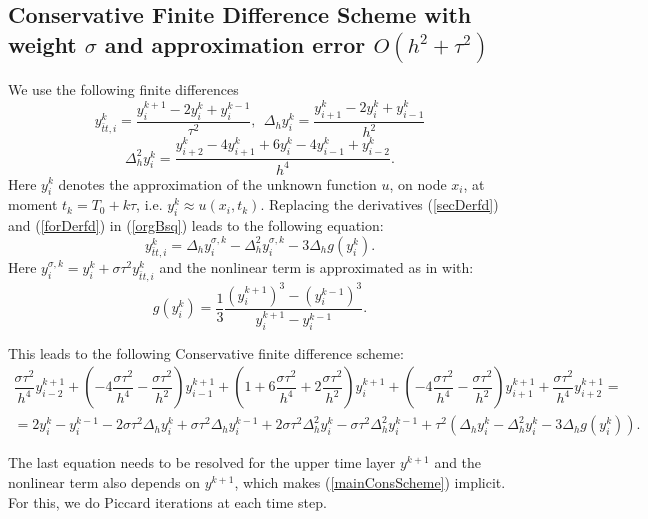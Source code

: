 \documentclass[%
 aip,
cp,  
 amsmath,amssymb,
 reprint,
]{iopconfser}
\newcommand{\rf}[1]{(\ref{#1})}
\begin{document}
\subsection{ Conservative Finite Difference Scheme with weight $\sigma$ and approximation error $O(h^2+\tau^2)$}

We use the following finite differences
\begin{equation}\label{secDerfd}
y_{\bar{t}t,i}^k=\dfrac{y_i^{k+1}-2y_i^k+y_i^{k-1}}{\tau^2},~~\Delta_h y_i^k=\dfrac{y_{i+1}^k-2y_i^k+y_{i-1}^k}{h^2}
\end{equation}
\begin{equation}\label{forDerfd}
\Delta_h^2 y_i^k=\dfrac{y_{i+2}^k-4y_{i+1}^k+6y_{i}^k-4y_{i-1}^k+y_{i-2}^k}{h^4}.
\end{equation}
Here $y_{i}^k$ denotes the approximation of the unknown function $u$, on node $x_i$, at moment $t_k = T_0 + k \tau$, i.e. $y_{i}^k \approx u(x_i,t_k)$. Replacing the derivatives \rf{secDerfd} and \rf{forDerfd} in \rf{orgBsq} leads to the following equation:
\begin{equation}\label{scheme1}
y_{\bar{t}t,i}^k=\Delta_h y_i^{\sigma,k}-\Delta_h^2 y_i^{\sigma,k} - 3\Delta_h g(y_i^k).
\end{equation}
Here $ y_i^{\sigma,k}= y_i^{k}+\sigma \tau^2 y_{\bar{t}t,i}^k$ and the nonlinear term is approximated as in \cite{consCitat} with:
\begin{equation}\label{nonLin}
g(y_i^k) = \frac{1}{3} \frac{(y_i^{k+1})^3 - (y_i^{k-1})^3}{y_i^{k+1} - y_i^{k-1}}.
\end{equation}

This leads to the following Conservative finite difference scheme:
\begin{eqnarray}\label{mainConsScheme}
\dfrac{\sigma\tau^2}{h^4}y_{i-2}^{k+1}+\left(-4\dfrac{\sigma\tau^2}{h^4}-\dfrac{\sigma\tau^2}{h^2}\right)y_{i-1}^{k+1}+\left(1+6\dfrac{\sigma\tau^2}{h^4}+2\dfrac{\sigma\tau^2}{h^2}\right)y_{i}^{k+1}+\left(-4\dfrac{\sigma\tau^2}{h^4}-\dfrac{\sigma\tau^2}{h^2}\right)y_{i+1}^{k+1}+\dfrac{\sigma\tau^2}{h^4}y_{i+2}^{k+1}=\nonumber\\
=2y_i^k-y_i^{k-1}-2\sigma\tau^2\Delta_h y_i^k+\sigma\tau^2\Delta_hy_i^{k-1}+2\sigma\tau^2\Delta_h^2y_i^k-\sigma\tau^2\Delta_h^2y_i^{k-1}+\tau^2\left(\Delta_hy_i^k-\Delta_h^2y_i^k-3\Delta_h g(y_i^k)\right).
\end{eqnarray}

The last equation needs to be resolved for the upper time layer $y^{k+1}$ and the nonlinear term also depends on $y^{k+1}$, which makes \rf{mainConsScheme} implicit. For this, we do Piccard iterations at each time step.
\end{document}
